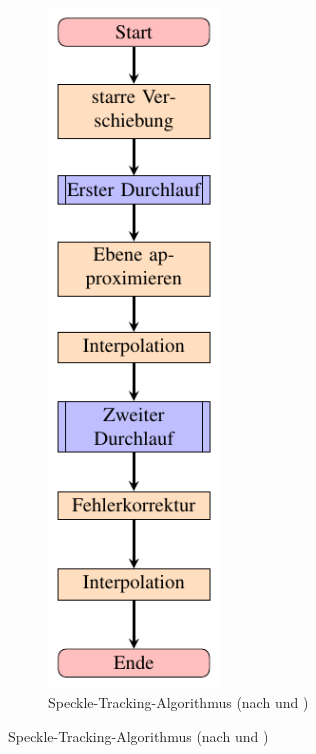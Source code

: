 \begin{figure}[h!]
	\centering
	\begin{subfigure}[b]{0.3\textwidth}
		\centering
		\includegraphics[width=0.5\textwidth]{pdf/graph_speckle}
		\caption[Speckle-Tracking]{Speckle-Tracking-Algorithmus (nach  und \cite{Coj17})}

\end{subfigure}
\end{figure}
